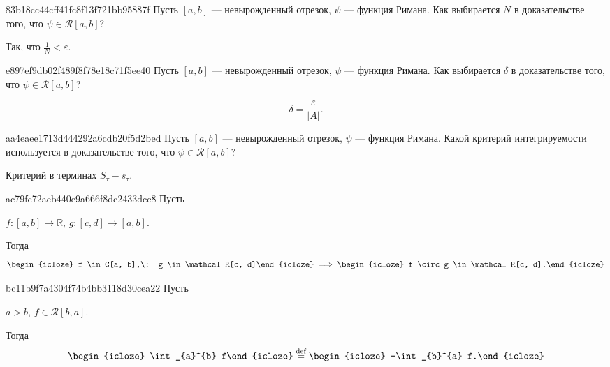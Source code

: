 \begin{note}{83b18cc44cff41fc8f13f721bb95887f}
    Пусть \({ [a, b]  }\) --- невырожденный отрезок, \({ \psi }\) --- функция Римана.
    Как выбирается \({ N }\) в доказательстве того, что \({ \psi \in \mathcal R[a, b] }\)?

    \begin{cloze}{1}
        Так, что \({ \frac{1}{N} < \varepsilon }\).
    \end{cloze}
\end{note}

\begin{note}{e897ef9db02f489f8f78e18c71f5ee40}
    Пусть \({ [a, b]  }\) --- невырожденный отрезок, \({ \psi }\) --- функция Римана.
    Как выбирается \({ \delta }\) в доказательстве того, что \({ \psi \in \mathcal R[a, b] }\)?

    \begin{cloze}{1}
        \[
            \delta = \frac{\varepsilon}{\left\lvert A \right\rvert}.
        \]
    \end{cloze}
\end{note}

\begin{note}{aa4eaee1713d444292a6cdb20f5d2bed}
    Пусть \({ [a, b]  }\) --- невырожденный отрезок, \({ \psi }\) --- функция Римана.
    Какой критерий интегрируемости используется в доказательстве того, что \({ \psi \in \mathcal R[a, b] }\)?

    \begin{cloze}{1}
        Критерий в терминах \({ S_\tau - s_\tau }\).
    \end{cloze}
\end{note}

\begin{note}{ac79fc72aeb440e9a666f8dc2433dcc8}
    Пусть \begin{icloze}{3}\({ f : [a, b] \to \mathbb R }\), \({ g : [c, d] \to [a, b] }\).\end{icloze}
    Тогда
    \[
        \begin{icloze}{2}f \in C[a, b],\:  g \in \mathcal R[c, d]\end{icloze} \implies \begin{icloze}{1}f \circ g \in \mathcal R[c, d].\end{icloze}
    \]
\end{note}

\begin{note}{bc11b9f7a4304f74b4bb3118d30cea22}
    Пусть \begin{icloze}{3}\({ a > b }\), \({ f \in \mathcal R[b, a] }\).\end{icloze} Тогда
    \[
        \begin{icloze}{2}\int_{a}^{b} f\end{icloze} \overset{\text{def}}= \begin{icloze}{1}-\int_{b}^{a} f.\end{icloze}
    \]
\end{note}

